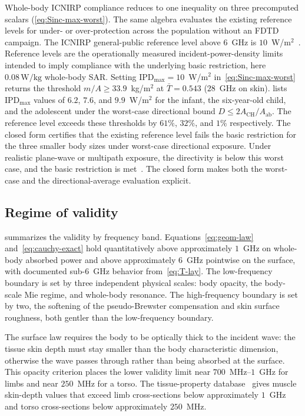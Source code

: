 \documentclass[journal,twocolumn,10pt]{IEEEtran}
\newcommand{\IPD}{\mathrm{IPD}}
\newcommand{\Aab}{A_{\mathrm{ab}}}
\newcommand{\Tbar}{\bar{T}}
\begin{document}
Whole-body ICNIRP compliance reduces to one inequality on three
precomputed scalars (\cref{eq:Sinc-max-worst}). The same algebra
evaluates the existing reference levels for under- or over-protection
across the population without an FDTD campaign. The ICNIRP
general-public reference level above $6$~GHz is
$10$~W/m$^2$~\cite{ICNIRP2020}. Reference levels are the
operationally measured incident-power-density limits intended to
imply compliance with the underlying basic restriction, here
$0.08\,\mathrm{W/kg}$ whole-body SAR. Setting $\IPD_{\mathrm{max}} =
10$~W/m$^2$ in~\eqref{eq:Sinc-max-worst} returns the threshold
$m/A \geq 33.9$~kg/m$^2$ at $\Tbar = 0.543$ ($28$~GHz on skin).
 lists $\IPD_{\mathrm{max}}$ values of $6.2$,
$7.6$, and $9.9$~W/m$^2$ for the infant, the six-year-old child, and
the adolescent under the worst-case directional bound
$D \le 2A_{\mathrm{CH}}/\Aab$. The reference level exceeds these
thresholds by $61\%$, $32\%$, and $1\%$ respectively. The closed form
certifies that the existing reference level fails the basic
restriction for the three smaller body sizes under worst-case
directional exposure. Under realistic plane-wave or multipath
exposure, the directivity is below this worst case, and the basic
restriction is met~\cite{ICNIRP2020}. The closed form makes both the
worst-case and the directional-average evaluation explicit.

\subsection{Regime of validity}\label{subsec:disc-validity}

 summarizes the validity by frequency band.
Equations~\eqref{eq:geom-law} and~\eqref{eq:cauchy-exact} hold
quantitatively above approximately $1$~GHz on whole-body absorbed
power and above approximately $6$~GHz pointwise on the surface, with
documented sub-$6$~GHz behavior from~\eqref{eq:T-lay}. The
low-frequency boundary is set by three independent physical scales:
body opacity, the body-scale Mie regime, and whole-body resonance.
The high-frequency boundary is set by two, the softening of the
pseudo-Brewster compensation and skin surface roughness, both gentler
than the low-frequency boundary.

The surface law requires the body to be optically thick to the
incident wave: the tissue skin depth must stay smaller than the body
characteristic dimension, otherwise the wave passes through rather
than being absorbed at the surface. This opacity criterion places
the lower validity limit near $700$~MHz--$1$~GHz for limbs and near
$250$~MHz for a torso. The tissue-property
database~\cite{Gabriel1996} gives muscle skin-depth values that
exceed limb cross-sections below approximately $1$~GHz and torso
cross-sections below approximately $250$~MHz.
\end{document}
